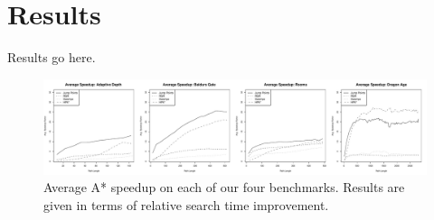 \section{Results}
Results go here.
\begin{figure}[t]
       \begin{center}
                       \includegraphics[width=2.0\columnwidth, trim = 10mm 10mm 10mm 0mm]{diagrams/speedup.pdf}
       \end{center}
       \caption{Average A* speedup on each of our four benchmarks. 
		Results are given in terms of relative search time improvement.}
\label{fig-speedup}
\end{figure}
